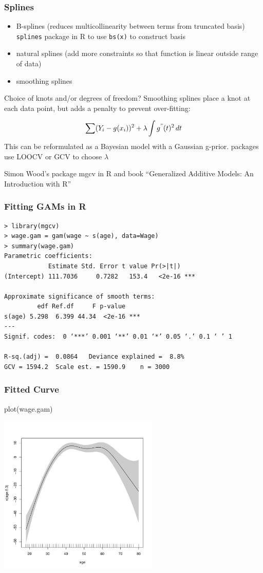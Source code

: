 \documentclass[]{beamer}
\begin{document}
\begin{frame}\frametitle{Splines}

  \begin{itemize}
  \item B-splines  (reduces multicollinearity between terms from
    truncated basis) {\tt splines} package in R to use {\tt bs(x)} to
    construct basis \pause
  \item natural splines   (add more constraints so that function is linear
    outside range of data) \pause
\item smoothing splines \pause
  \end{itemize}

Choice of knots and/or degrees of freedom? \pause   Smoothing splines place
a knot at each data point, but adds
 a penalty to prevent over-fitting:

$$ \sum (Y_i - g(x_i))^2 +  \lambda \int g^{"}(t)^2 \, dt $$
\pause
This can be reformulated as a Bayesian model with a Gaussian g-prior.
packages use LOOCV or GCV to choose $\lambda$

Simon Wood's package mgcv in R   and book ``Generalized Additive Models: An Introduction with R''


\end{frame}

\begin{frame}[fragile]\frametitle{Fitting GAMs in R}
\begin{verbatim}
> library(mgcv)
> wage.gam = gam(wage ~ s(age), data=Wage)
> summary(wage.gam)
Parametric coefficients:
            Estimate Std. Error t value Pr(>|t|)    
(Intercept) 111.7036     0.7282   153.4   <2e-16 ***

Approximate significance of smooth terms:
         edf Ref.df     F p-value    
s(age) 5.298  6.399 44.34  <2e-16 ***
---
Signif. codes:  0 ‘***’ 0.001 ‘**’ 0.01 ‘*’ 0.05 ‘.’ 0.1 ‘ ’ 1

R-sq.(adj) =  0.0864   Deviance explained =  8.8%
GCV = 1594.2  Scale est. = 1590.9    n = 3000
\end{verbatim}
\end{frame}
\begin{frame}\frametitle{Fitted Curve}
  plot(wage.gam)
\centerline{\includegraphics[height=3in]{gam-age}}
\end{frame}
\end{document}

